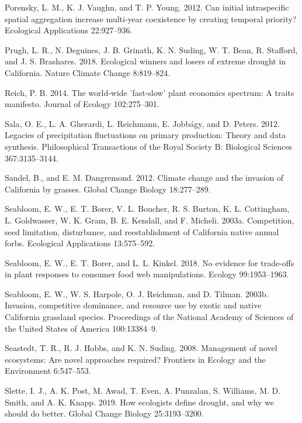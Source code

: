 \documentclass[twoside,12pt,final]{ucthesis-CA2012}
\begin{document}
\begin{ucmainmatter}
\leavevmode\hypertarget{ref-Porensky2012}{}%
Porensky, L. M., K. J. Vaughn, and T. P. Young. 2012. Can initial intraspecific spatial aggregation increase multi-year coexistence by creating temporal priority? Ecological Applications 22:927--936.

\leavevmode\hypertarget{ref-Prugh2018}{}%
Prugh, L. R., N. Deguines, J. B. Grinath, K. N. Suding, W. T. Bean, R. Stafford, and J. S. Brashares. 2018. Ecological winners and losers of extreme drought in California. Nature Climate Change 8:819--824.

\leavevmode\hypertarget{ref-Reich2014}{}%
Reich, P. B. 2014. The world-wide 'fast-slow' plant economics spectrum: A traits manifesto. Journal of Ecology 102:275--301.

\leavevmode\hypertarget{ref-Sala2012b}{}%
Sala, O. E., L. A. Gherardi, L. Reichmann, E. Jobbágy, and D. Peters. 2012. Legacies of precipitation fluctuations on primary production: Theory and data synthesis. Philosophical Transactions of the Royal Society B: Biological Sciences 367:3135--3144.

\leavevmode\hypertarget{ref-Sandel2012}{}%
Sandel, B., and E. M. Dangremond. 2012. Climate change and the invasion of California by grasses. Global Change Biology 18:277--289.

\leavevmode\hypertarget{ref-Seabloom2003}{}%
Seabloom, E. W., E. T. Borer, V. L. Boucher, R. S. Burton, K. L. Cottingham, L. Goldwasser, W. K. Gram, B. E. Kendall, and F. Micheli. 2003a. Competition, seed limitation, disturbance, and reestablishment of California native annual forbs. Ecological Applications 13:575--592.

\leavevmode\hypertarget{ref-Seabloom2018}{}%
Seabloom, E. W., E. T. Borer, and L. L. Kinkel. 2018. No evidence for trade-offs in plant responses to consumer food web manipulations. Ecology 99:1953--1963.

\leavevmode\hypertarget{ref-Seabloom2003a}{}%
Seabloom, E. W., W. S. Harpole, O. J. Reichman, and D. Tilman. 2003b. Invasion, competitive dominance, and resource use by exotic and native California grassland species. Proceedings of the National Academy of Sciences of the United States of America 100:13384--9.

\leavevmode\hypertarget{ref-Seastedt2008}{}%
Seastedt, T. R., R. J. Hobbs, and K. N. Suding. 2008. Management of novel ecosystems: Are novel approaches required? Frontiers in Ecology and the Environment 6:547--553.

\leavevmode\hypertarget{ref-Slette2019}{}%
Slette, I. J., A. K. Post, M. Awad, T. Even, A. Punzalan, S. Williams, M. D. Smith, and A. K. Knapp. 2019. How ecologists define drought, and why we should do better. Global Change Biology 25:3193--3200.


\end{ucmainmatter}
\end{document}
